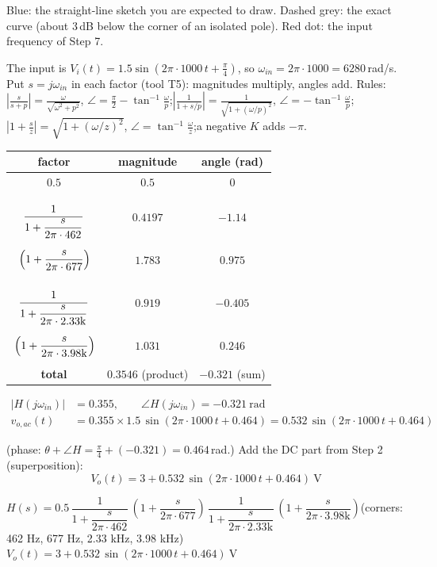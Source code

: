 \documentclass[11pt]{article}
\newcommand{\solstep}[2]{\par\medskip{\color{stepc}\textbf{Step #1 --- #2}}\par\nopagebreak}
\begin{document}
{\small Blue: the straight-line sketch you are expected to draw. Dashed grey: the exact curve (about 3\,dB below the corner of an isolated pole). Red dot: the input frequency of Step 7.}
\solstep{7}{Steady-state output}The input is $V_i(t) = 1.5\sin\left(2\pi\cdot 1000\,t+\frac{\pi}{4}\right)$, so $\omega_{in} = 2\pi\cdot 1000 = 6280$\,rad/s. Put $s=j\omega_{in}$ in each factor (tool T5): magnitudes multiply, angles add.
{\small Rules: $\left|\frac{s}{s+p}\right| = \frac{\omega}{\sqrt{\omega^2+p^2}}$, $\angle = \frac{\pi}{2}-\tan^{-1}\frac{\omega}{p}$;\quad $\left|\frac{1}{1+s/p}\right| = \frac{1}{\sqrt{1+(\omega/p)^2}}$, $\angle = -\tan^{-1}\frac{\omega}{p}$;\quad $\left|1+\frac{s}{z}\right| = \sqrt{1+(\omega/z)^2}$, $\angle = \tan^{-1}\frac{\omega}{z}$;\quad a negative $K$ adds $-\pi$.}
\begin{center}\renewcommand{\arraystretch}{1.35}
\begin{tabular}{ccc}
\toprule
factor & magnitude & angle (rad) \\
\midrule
$0.5$ & $0.5$ & $0$ \\
$\rule[-1.7em]{0pt}{4em}\dfrac{1}{1+\dfrac{s}{2\pi\cdot 462}}$ & $0.4197$ & $-1.14$ \\
$\rule[-1.1em]{0pt}{2.8em}\left(1+\dfrac{s}{2\pi\cdot 677}\right)$ & $1.783$ & $0.975$ \\
$\rule[-1.7em]{0pt}{4em}\dfrac{1}{1+\dfrac{s}{2\pi\cdot 2.33\mathrm{k}}}$ & $0.919$ & $-0.405$ \\
$\rule[-1.1em]{0pt}{2.8em}\left(1+\dfrac{s}{2\pi\cdot 3.98\mathrm{k}}\right)$ & $1.031$ & $0.246$ \\
\textbf{total} & $\mathbf{0.3546}$ (product) & $\mathbf{-0.321}$ (sum) \\
\bottomrule
\end{tabular}\end{center}

\begin{align*}
|H(j\omega_{in})| &= 0.355, \qquad \angle H(j\omega_{in}) = -0.321\ \mathrm{rad} \\
v_{o,ac}(t) &= 0.355\times 1.5\,\sin\left(2\pi\cdot 1000\,t + 0.464\right) = 0.532\,\sin\left(2\pi\cdot 1000\,t + 0.464\right)
\end{align*}

(phase: $\theta + \angle H = \frac{\pi}{4} + (-0.321) = 0.464$\,rad.)
Add the DC part from Step 2 (superposition):
\[
\boxed{V_o(t) = 3 + 0.532\,\sin\left(2\pi\cdot 1000\,t + 0.464\right)\ \mathrm{V}}
\]

\begin{ansbox}
$H(s) = 0.5\,\dfrac{1}{1+\dfrac{s}{2\pi\cdot 462}}\,\left(1+\dfrac{s}{2\pi\cdot 677}\right)\,\dfrac{1}{1+\dfrac{s}{2\pi\cdot 2.33\mathrm{k}}}\,\left(1+\dfrac{s}{2\pi\cdot 3.98\mathrm{k}}\right)$\quad (corners: 462 Hz, 677 Hz, 2.33 kHz, 3.98 kHz)\\[4pt]
$V_o(t) = 3 + 0.532\,\sin\left(2\pi\cdot 1000\,t + 0.464\right)\ \mathrm{V}$
\end{ansbox}
\end{document}
